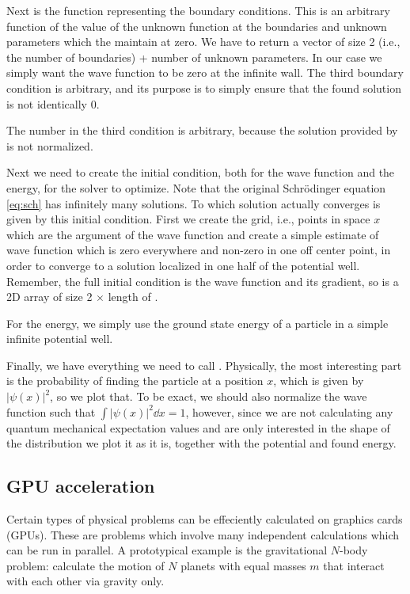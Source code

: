 Next is the function representing the boundary conditions. This is an arbitrary function of the value of the unknown function at the boundaries and unknown parameters which the  maintain at zero. We have to return a vector of size 2 (i.e., the number of boundaries) + number of unknown parameters. In our case we simply want the wave function to be zero at the infinite wall. The third boundary condition is arbitrary, and its purpose is to simply ensure that the found solution is not identically 0.

The number in the third condition is arbitrary, because the solution provided by  is not normalized.

Next we need to create the initial condition, both for the wave function and the energy, for the solver to optimize. Note that the original Schrödinger equation \eqref{eq:sch} has infinitely many solutions. To which solution  actually converges is given by this initial condition. First we create the grid, i.e., points in space $x$ which are the argument of the wave function and create a simple estimate of wave function which is zero everywhere and non-zero in one off center point, in order to converge to a solution localized in one half of the potential well. Remember, the full initial condition is the wave function and its gradient, so  is a 2D array of size 2 $\times$ length of .


For the energy, we simply use the ground state energy of a particle in a simple infinite potential well.


Finally, we have everything we need to call . Physically, the most interesting part is the probability of finding the particle at a position $x$, which is given by $|\psi(x)|^2$, so we plot that. To be exact, we should also normalize the wave function such that $\int |\psi(x)|^2 \dd x = 1$, however, since we are not calculating any quantum mechanical expectation values and are only interested in the shape of the distribution we plot it as it is, together with the potential and found energy.


\subsection{GPU acceleration}
Certain types of physical problems can be effeciently calculated on graphics cards (GPUs). These are problems which involve many independent calculations which can be run in parallel. A prototypical example is the gravitational $N$-body problem: calculate the motion of $N$ planets with equal masses $m$ that interact with each other via gravity only.

